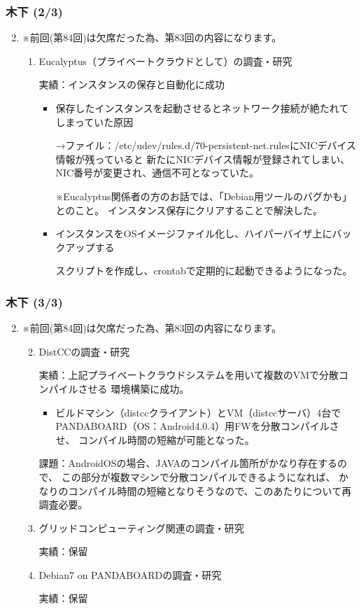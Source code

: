 \documentclass[cjk,dvipdfmx,10pt,compress,%
hyperref={bookmarks=true,bookmarksnumbered=true,bookmarksopen=false,%
colorlinks=false,%
pdftitle={第 85 回 関西 Debian 勉強会},%
pdfauthor={倉敷・のがた・佐々木・かわだ・八津尾},%
pdfsubject={資料},%
}]{beamer}
\begin{document}
\begin{frame}
  \frametitle{ 木下 (2/3)}
  \begin{enumerate}
    \setcounter{enumi}{1}
  \item ※前回(第84回)は欠席だった為、第83回の内容になります。
    \begin{enumerate}
    \item Eucalyptus（プライベートクラウドとして）の調査・研究

      実績：インスタンスの保存と自動化に成功
      \begin{itemize}
      \item 保存したインスタンスを起動させるとネットワーク接続が絶たれてしまっていた原因

        →ファイル：/etc/udev/rules.d/70-persistent-net.rulesにNICデバイス情報が残っていると
        新たにNICデバイス情報が登録されてしまい、NIC番号が変更され、通信不可となっていた。

        ※Eucalyptus関係者の方のお話では、「Debian用ツールのバグかも」とのこと。
        インスタンス保存にクリアすることで解決した。
      \item インスタンスをOSイメージファイル化し、ハイパーバイザ上にバックアップする

        スクリプトを作成し、crontabで定期的に起動できるようになった。
      \end{itemize}
    \end{enumerate}
  \end{enumerate}
\end{frame}

\begin{frame}
  \frametitle{ 木下 (3/3)}
  \begin{enumerate}
    \setcounter{enumi}{1}
  \item ※前回(第84回)は欠席だった為、第83回の内容になります。
    \begin{enumerate}
      \setcounter{enumii}{1}
    \item DistCCの調査・研究

      実績：上記プライベートクラウドシステムを用いて複数のVMで分散コンパイルさせる
      環境構築に成功。
      \begin{itemize}
      \item ビルドマシン（distccクライアント）とVM（distccサーバ）4台で
        PANDABOARD（OS：Android4.0.4）用FWを分散コンパイルさせ、
        コンパイル時間の短縮が可能となった。
      \end{itemize}
      課題：AndroidOSの場合、JAVAのコンパイル箇所がかなり存在するので、
      この部分が複数マシンで分散コンパイルできるようになれば、
      かなりのコンパイル時間の短縮となりそうなので、このあたりについて再調査必要。
    \item グリッドコンピューティング関連の調査・研究

      実績：保留
    \item Debian7 on PANDABOARDの調査・研究

      実績：保留
    \end{enumerate}
  \end{enumerate}
\end{frame}
\end{document}
